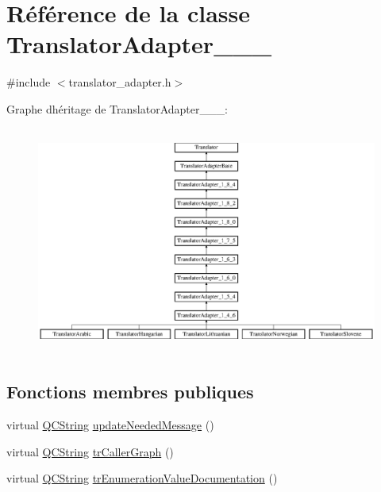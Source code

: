 \hypertarget{class_translator_adapter__1__4__6}{}\section{Référence de la classe Translator\+Adapter\+\_\+\_\+\_}
\label{class_translator_adapter__1__4__6}


{\ttfamily \#include $<$translator\+\_\+adapter.\+h$>$}

Graphe d\textquotesingle{}héritage de Translator\+Adapter\+\_\+\_\+\_\+:\begin{figure}[H]
\begin{center}
\leavevmode
\includegraphics[height=7.512195cm]{class_translator_adapter__1__4__6}
\end{center}
\end{figure}
\subsection*{Fonctions membres publiques}
\begin{DoxyCompactItemize}
\item 
virtual \hyperlink{class_q_c_string}{Q\+C\+String} \hyperlink{class_translator_adapter__1__4__6_ab19b01d4e00c95ef1e6eb631fbe6ada4}{update\+Needed\+Message} ()
\item 
virtual \hyperlink{class_q_c_string}{Q\+C\+String} \hyperlink{class_translator_adapter__1__4__6_ab40d3a24ac006a4c4e41cc49c97dddbf}{tr\+Caller\+Graph} ()
\item 
virtual \hyperlink{class_q_c_string}{Q\+C\+String} \hyperlink{class_translator_adapter__1__4__6_a46acaafe098b6f0f1ac86ca80746ff1f}{tr\+Enumeration\+Value\+Documentation} ()
\end{DoxyCompactItemize}
